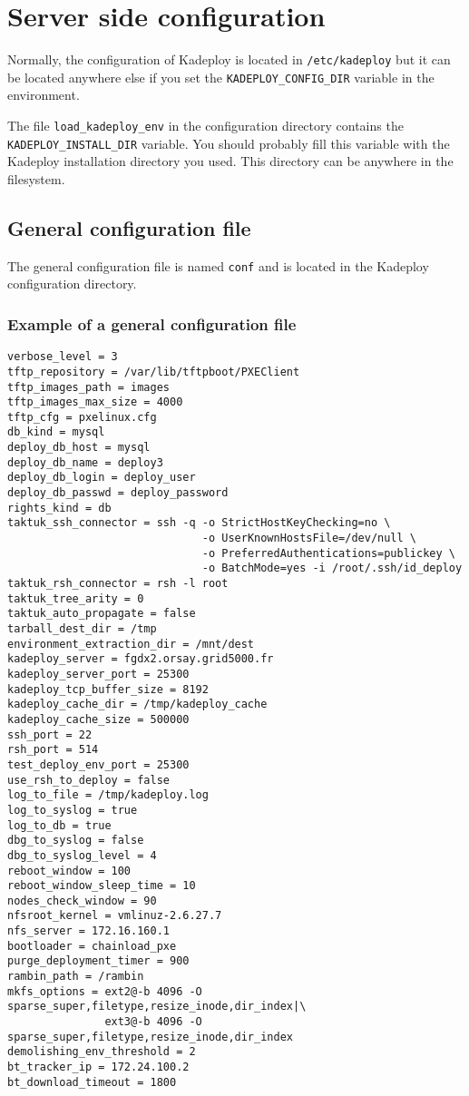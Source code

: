 \documentclass[a4wide,10pt,oneside]{book}
\begin{document}
\chapter{Server side configuration}
Normally, the configuration of Kadeploy is located in \texttt{/etc/kadeploy} but it can be located anywhere else if you set the \texttt{KADEPLOY\_CONFIG\_DIR} variable in the environment.

The file \texttt{load\_kadeploy\_env} in the configuration directory contains the \texttt{KADEPLOY\_INSTALL\_DIR} variable. You should probably fill this variable with the Kadeploy installation directory you used. This directory can be anywhere in the filesystem.

\section{General configuration file}\label{sec:general_config}
The general configuration file is named \texttt{conf} and is located in the Kadeploy configuration directory.
\subsection{Example of a general configuration file}
\begin{small}
\begin{verbatim}
verbose_level = 3
tftp_repository = /var/lib/tftpboot/PXEClient
tftp_images_path = images
tftp_images_max_size = 4000
tftp_cfg = pxelinux.cfg
db_kind = mysql
deploy_db_host = mysql
deploy_db_name = deploy3
deploy_db_login = deploy_user
deploy_db_passwd = deploy_password
rights_kind = db
taktuk_ssh_connector = ssh -q -o StrictHostKeyChecking=no \
                              -o UserKnownHostsFile=/dev/null \
                              -o PreferredAuthentications=publickey \
                              -o BatchMode=yes -i /root/.ssh/id_deploy
taktuk_rsh_connector = rsh -l root
taktuk_tree_arity = 0
taktuk_auto_propagate = false
tarball_dest_dir = /tmp
environment_extraction_dir = /mnt/dest
kadeploy_server = fgdx2.orsay.grid5000.fr
kadeploy_server_port = 25300
kadeploy_tcp_buffer_size = 8192
kadeploy_cache_dir = /tmp/kadeploy_cache
kadeploy_cache_size = 500000
ssh_port = 22
rsh_port = 514
test_deploy_env_port = 25300
use_rsh_to_deploy = false
log_to_file = /tmp/kadeploy.log
log_to_syslog = true
log_to_db = true
dbg_to_syslog = false
dbg_to_syslog_level = 4
reboot_window = 100
reboot_window_sleep_time = 10
nodes_check_window = 90
nfsroot_kernel = vmlinuz-2.6.27.7
nfs_server = 172.16.160.1
bootloader = chainload_pxe
purge_deployment_timer = 900
rambin_path = /rambin
mkfs_options = ext2@-b 4096 -O sparse_super,filetype,resize_inode,dir_index|\
               ext3@-b 4096 -O sparse_super,filetype,resize_inode,dir_index
demolishing_env_threshold = 2
bt_tracker_ip = 172.24.100.2
bt_download_timeout = 1800
\end{verbatim}
\end{small}
\end{document}
